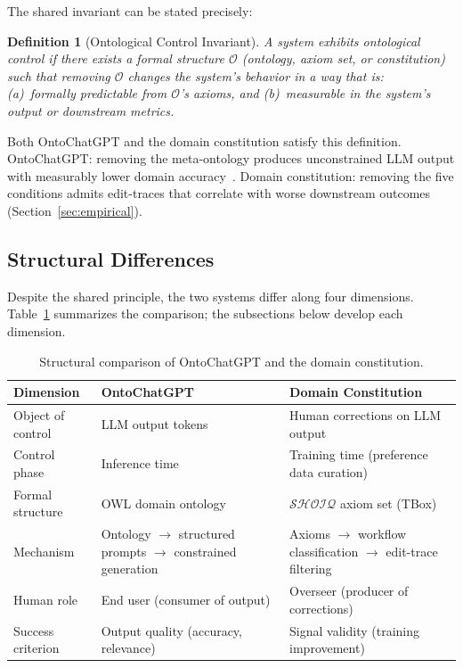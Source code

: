 \documentclass[11pt]{article}
\newtheorem{definition}{Definition}[section]
\newcommand{\DL}{\ensuremath{\mathcal{SHOIQ}}\xspace}
\begin{document}
The shared invariant can be stated precisely:

\begin{definition}[Ontological Control Invariant]
\label{def:invariant}
A system exhibits \emph{ontological control} if there exists a formal structure $\mathcal{O}$ (ontology, axiom set, or constitution) such that removing $\mathcal{O}$ changes the system's behavior in a way that is:
(a)~formally predictable from $\mathcal{O}$'s axioms, and
(b)~measurable in the system's output or downstream metrics.
\end{definition}

Both OntoChatGPT and the domain constitution satisfy this definition.
OntoChatGPT: removing the meta-ontology produces unconstrained LLM output with measurably lower domain accuracy~\citep{palagin2023ontochatgpt}.
Domain constitution: removing the five conditions admits edit-traces that correlate with worse downstream outcomes (Section~\ref{sec:empirical}).

\subsection{Structural Differences}
\label{sec:structural-diff}

Despite the shared principle, the two systems differ along four dimensions.
Table~\ref{tab:comparison} summarizes the comparison; the subsections below develop each dimension.

\begin{table}[h]
\centering
\caption{Structural comparison of OntoChatGPT and the domain constitution.}
\label{tab:comparison}
\begin{tabular}{@{}p{3cm}p{5.2cm}p{5.2cm}@{}}
\toprule
\textbf{Dimension} & \textbf{OntoChatGPT} & \textbf{Domain Constitution} \\
\midrule
Object of control     & LLM output tokens       & Human corrections on LLM output \\
Control phase         & Inference time           & Training time (preference data curation) \\
Formal structure      & OWL domain ontology      & \DL axiom set (TBox) \\
Mechanism             & Ontology $\to$ structured prompts $\to$ constrained generation & Axioms $\to$ workflow classification $\to$ edit-trace filtering \\
Human role            & End user (consumer of output) & Overseer (producer of corrections) \\
Success criterion     & Output quality (accuracy, relevance) & Signal validity (training improvement) \\
\bottomrule
\end{tabular}
\end{table}
\end{document}
